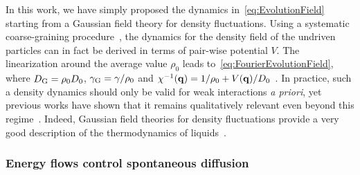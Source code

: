 \documentclass[pre, superscriptaddress, twocolumn,pre]{revtex4-1}
\begin{document}
In this work, we have simply proposed the dynamics in~\eqref{eq:EvolutionField} starting from a Gaussian field theory for density fluctuations.  Using a systematic coarse-graining procedure~\cite{Dean1996}, the dynamics for the density field of the undriven particles can in fact be derived in terms of pair-wise potential $V$. The linearization around the average value $\rho_0$ leads to~\eqref{eq:FourierEvolutionField}, where $D_{\rm G}=\rho_0D_0$, $\gamma_{\rm G}=\gamma/\rho_0$ and $\chi^{-1}({\bf q}) = 1/\rho_0 + V({\bf q})/D_0$~\cite{Demery2011, Demery2014}. In practice, such a density dynamics should only be valid for weak interactions {\it a priori}, yet previous works have shown that it remains qualitatively relevant even beyond this regime~\cite{Demery2015, Martin2018, Nemoto2018a}. Indeed, Gaussian field theories for density fluctuations provide a very good description of the thermodynamics of liquids~\cite{Chandler1993}.









\subsubsection{Energy flows control spontaneous diffusion}\label{sec:diff}
\end{document}
